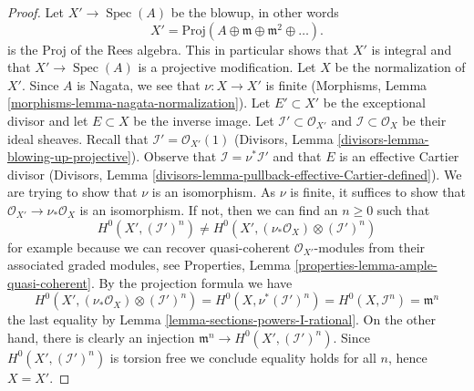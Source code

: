\documentclass[10pt,a4paper]{amsart}
\theoremstyle{plain}
\theoremstyle{definition}
\theoremstyle{remark}
\numberwithin{equation}{subsection}
\def\Spec{\mathop{\mathrm{Spec}}}
\begin{document}
\begin{proof}
Let $X' \to \Spec(A)$ be the blowup, in other words
$$
X' = \text{Proj}(A \oplus \mathfrak m \oplus \mathfrak m^2 \oplus \ldots).
$$
is the Proj of the Rees algebra. This in particular shows that
$X'$ is integral and that $X' \to \Spec(A)$ is a projective
modification. Let $X$ be the normalization of $X'$.
Since $A$ is Nagata, we see that $\nu : X \to X'$ is finite
(Morphisms, Lemma \ref{morphisms-lemma-nagata-normalization}).
Let $E' \subset X'$ be the exceptional divisor and let $E \subset X$
be the inverse image. Let $\mathcal{I}' \subset \mathcal{O}_{X'}$
and $\mathcal{I} \subset \mathcal{O}_X$ be their ideal sheaves.
Recall that $\mathcal{I}' = \mathcal{O}_{X'}(1)$
(Divisors, Lemma \ref{divisors-lemma-blowing-up-projective}).
Observe that $\mathcal{I} = \nu^*\mathcal{I}'$ and that $E$ is an
effective Cartier divisor (Divisors, Lemma
\ref{divisors-lemma-pullback-effective-Cartier-defined}).
We are trying to show that $\nu$ is an isomorphism. As $\nu$ is finite,
it suffices to show that $\mathcal{O}_{X'} \to \nu_*\mathcal{O}_X$
is an isomorphism. If not, then we can find an $n \geq 0$ such that
$$
H^0(X', (\mathcal{I}')^n) \not =
H^0(X', (\nu_*\mathcal{O}_X) \otimes (\mathcal{I}')^n)
$$
for example because we can recover quasi-coherent $\mathcal{O}_{X'}$-modules
from their associated graded modules, see
Properties, Lemma \ref{properties-lemma-ample-quasi-coherent}.
By the projection formula we have
$$
H^0(X', (\nu_*\mathcal{O}_X) \otimes (\mathcal{I}')^n) =
H^0(X, \nu^*(\mathcal{I}')^n) =
H^0(X, \mathcal{I}^n) = \mathfrak m^n
$$
the last equality by Lemma \ref{lemma-sections-powers-I-rational}.
On the other hand, there is clearly an injection
$\mathfrak m^n \to H^0(X', (\mathcal{I}')^n)$. Since
$H^0(X', (\mathcal{I}')^n)$ is torsion free we conclude equality holds
for all $n$, hence $X = X'$.
\end{proof}
\end{document}
